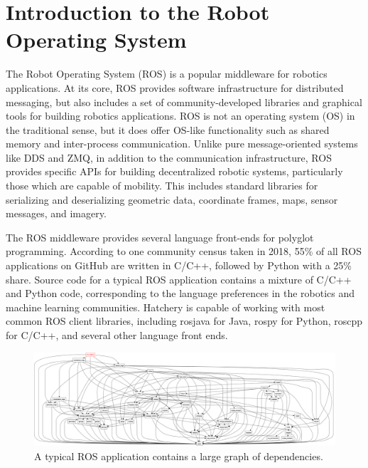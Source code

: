 \documentclass[12pt,initial,twoside,maitrise]{dms}
\numberwithin{equation}{section}
\numberwithin{table}{chapter}
\numberwithin{figure}{chapter}
\begin{document}
\section{Introduction to the Robot Operating System}

The Robot Operating System (ROS) is a popular middleware for robotics applications. At its core, ROS provides software infrastructure for distributed messaging, but also includes a set of community-developed libraries and graphical tools for building robotics applications. ROS is not an operating system (OS) in the traditional sense, but it does offer OS-like functionality such as shared memory and inter-process communication. Unlike pure message-oriented systems like DDS and ZMQ, in addition to the communication infrastructure, ROS provides specific APIs for building decentralized robotic systems, particularly those which are capable of mobility. This includes standard libraries for serializing and deserializing geometric data, coordinate frames, maps, sensor messages, and imagery.

The ROS middleware provides several language front-ends for polyglot programming. According to one community census taken in 2018, 55\% of all ROS applications on GitHub are written in C/C++, followed by Python with a 25\%~\citep{Areserio54:online} share. Source code for a typical ROS application contains a mixture of C/C++ and Python code, corresponding to the language preferences in the robotics and machine learning communities. Hatchery is capable of working with most common ROS client libraries, including rosjava for Java, rospy for Python, roscpp for C/C++, and several other language front ends.

\begin{figure}
\centering
\includegraphics[width=\textwidth]{rqt_dep_graph.png}
\caption{A typical ROS application contains a large graph of dependencies.}
\end{figure}
\end{document}
